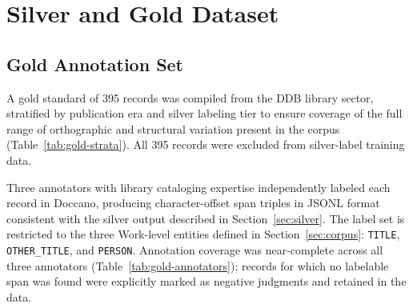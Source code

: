 \section{Silver and Gold Dataset}
\label{sec:silverandgold}

%
%

\subsection{Gold Annotation Set}
\label{sec:gold}

A gold standard of 395 records was compiled from the DDB library sector,
stratified by publication era and silver labeling tier to ensure coverage
of the full range of orthographic and structural variation present in the
corpus (Table~\ref{tab:gold-strata}).
All 395 records were excluded from silver-label training data.

Three annotators with library cataloging expertise independently labeled
each record in Doccano, producing character-offset span triples in JSONL
format consistent with the silver output described in
Section~\ref{sec:silver}.
The label set is restricted to the three Work-level entities defined in
Section~\ref{sec:corpus}: \texttt{TITLE}, \texttt{OTHER\_TITLE}, and
\texttt{PERSON}.
Annotation coverage was near-complete across all three annotators
(Table~\ref{tab:gold-annotators}); records for which no labelable span
was found were explicitly marked as negative judgments and retained in
the data.

